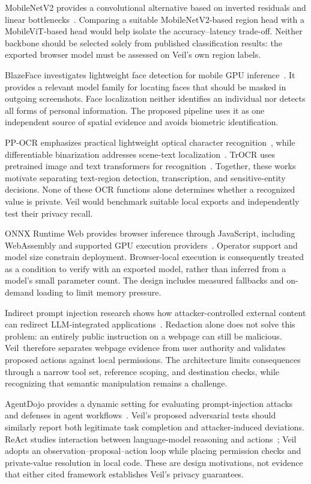 \documentclass[conference]{IEEEtran}
\newcommand{\sys}{Veil}
\begin{document}
MobileNetV2 provides a convolutional alternative based on inverted residuals and linear bottlenecks~\cite{mobilenet}. Comparing a suitable MobileNetV2-based region head with a MobileViT-based head would help isolate the accuracy--latency trade-off. Neither backbone should be selected solely from published classification results: the exported browser model must be assessed on Veil's own region labels.

BlazeFace investigates lightweight face detection for mobile GPU inference~\cite{blazeface}. It provides a relevant model family for locating faces that should be masked in outgoing screenshots. Face localization neither identifies an individual nor detects all forms of personal information. The proposed pipeline uses it as one independent source of spatial evidence and avoids biometric identification.

PP-OCR emphasizes practical lightweight optical character recognition~\cite{ppocr}, while differentiable binarization addresses scene-text localization~\cite{dbnet}. TrOCR uses pretrained image and text transformers for recognition~\cite{trocr}. Together, these works motivate separating text-region detection, transcription, and sensitive-entity decisions. None of these OCR functions alone determines whether a recognized value is private. Veil would benchmark suitable local exports and independently test their privacy recall.

ONNX Runtime Web provides browser inference through JavaScript, including WebAssembly and supported GPU execution providers~\cite{ort}. Operator support and model size constrain deployment. Browser-local execution is consequently treated as a condition to verify with an exported model, rather than inferred from a model's small parameter count. The design includes measured fallbacks and on-demand loading to limit memory pressure.

Indirect prompt injection research shows how attacker-controlled external content can redirect LLM-integrated applications~\cite{injection}. Redaction alone does not solve this problem: an entirely public instruction on a webpage can still be malicious. \sys\ therefore separates webpage evidence from user authority and validates proposed actions against local permissions. The architecture limits consequences through a narrow tool set, reference scoping, and destination checks, while recognizing that semantic manipulation remains a challenge.

AgentDojo provides a dynamic setting for evaluating prompt-injection attacks and defenses in agent workflows~\cite{agentdojo}. Veil's proposed adversarial tests should similarly report both legitimate task completion and attacker-induced deviations. ReAct studies interaction between language-model reasoning and actions~\cite{react}; Veil adopts an observation--proposal--action loop while placing permission checks and private-value resolution in local code. These are design motivations, not evidence that either cited framework establishes Veil's privacy guarantees.
\end{document}

